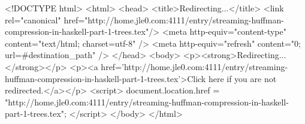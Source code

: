 <!DOCTYPE html>
<html>
<head>
<title>Redirecting...</title>
<link rel="canonical" href="http://home.jle0.com:4111/entry/streaming-huffman-compression-in-haskell-part-1-trees.tex"/>
<meta http-equiv="content-type" content="text/html; charset=utf-8" />
<meta http-equiv="refresh" content="0; url=#{destination_path}" />
</head>
<body>
  <p><strong>Redirecting...</strong></p>
  <p><a href='http://home.jle0.com:4111/entry/streaming-huffman-compression-in-haskell-part-1-trees.tex'>Click here if you are not redirected.</a></p>
  <script>
    document.location.href = "http://home.jle0.com:4111/entry/streaming-huffman-compression-in-haskell-part-1-trees.tex";
  </script>
</body>
</html>

